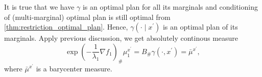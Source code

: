 It is true that we have $\gamma$ is an optimal plan for all its marginals
and conditioning of (multi-marginal) optimal plan is still optimal from \cref{thm:restriction_optimal_plan}.
Hence, $\gamma(\cdot \mid x^\prime)$ is an optimal plan of its marginals.
Apply previous discussion, we get absolutely continous measure
\[
	\exp(-\frac{1}{\lambda_1}\nabla f_1)_{\#}  \mu_1^{x^\prime}=
	B_{\#}\gamma(\cdot, x^\prime) =
	\bar{\mu}^{x^\prime},
\]
where $\bar{\mu}^{x^\prime}$ is a barycenter measure.





